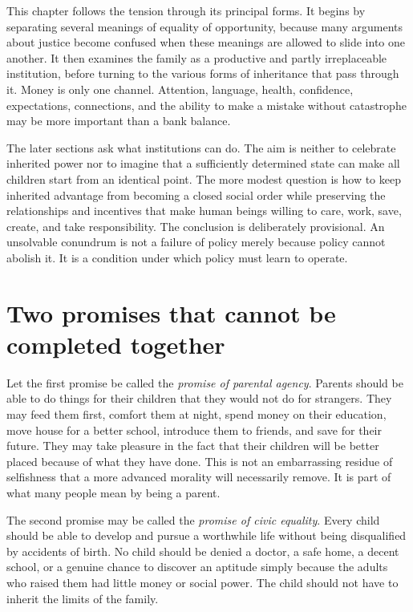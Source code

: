 ﻿\documentclass[12pt,a4paper]{book}
\begin{document}
This chapter follows the tension through its principal forms.  It begins
by separating several meanings of equality of opportunity, because many
arguments about justice become confused when these meanings are allowed to
slide into one another.  It then examines the family as a productive and
partly irreplaceable institution, before turning to the various forms of
inheritance that pass through it.  Money is only one channel.  Attention,
language, health, confidence, expectations, connections, and the ability to
make a mistake without catastrophe may be more important than a bank
balance.

The later sections ask what institutions can do.  The aim is neither to
celebrate inherited power nor to imagine that a sufficiently determined
state can make all children start from an identical point.  The more modest
question is how to keep inherited advantage from becoming a closed social
order while preserving the relationships and incentives that make human
beings willing to care, work, save, create, and take responsibility.  The
conclusion is deliberately provisional.  An unsolvable conundrum is not a
failure of policy merely because policy cannot abolish it.  It is a condition
under which policy must learn to operate.

\section{Two promises that cannot be completed together}

Let the first promise be called the \emph{promise of parental agency}.
Parents should be able to do things for their children that they would not
do for strangers.  They may feed them first, comfort them at night, spend
money on their education, move house for a better school, introduce them to
friends, and save for their future.  They may take pleasure in the fact that
their children will be better placed because of what they have done.  This
is not an embarrassing residue of selfishness that a more advanced morality
will necessarily remove.  It is part of what many people mean by being a
parent.

The second promise may be called the \emph{promise of civic equality}.
Every child should be able to develop and pursue a worthwhile life without
being disqualified by accidents of birth.  No child should be denied a
doctor, a safe home, a decent school, or a genuine chance to discover an
aptitude simply because the adults who raised them had little money or
social power.  The child should not have to inherit the limits of the
family.
\end{document}
